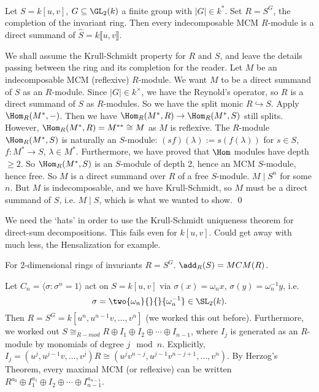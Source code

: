 \begin{thm}[Herzog, 1978]
Let $S= k[u,v]$, $G \subseteq \GL_2(k)$ a finite group with $|G| \in k^*$. Set $R= \widehat{S^G}$, the completion of the invariant ring. Then every indecomposable MCM $R$-module is a direct summand of $\hat{S}= k\llbracket u,v \rrbracket$.
\end{thm}

\pf We shall assume the Krull-Schmidt property for $R$ and $S$, and leave the details passing between the ring and its completion for the reader. Let $M$ be an indecomposable MCM (reflexive) $R$-module. We want $M$ to be a direct summand of $S$ as an $R$-module. Since $|G| \in k^\times$, we have the Reynold's operator, so $R$ is a direct summand of $S$ as $R$-modules. So we have the split monic $R \hookrightarrow S$. Apply $\Hom_R(M^*,-)$. Then we have $\Hom_R(M^*,R) \to \Hom_R(M^*,S)$ still splits. However, $\Hom_R(M^*,R)=M^{**} \cong M$ as $M$ is reflexive. The $R$-module $\Hom_R(M^*,S)$ is naturally an $S$-module: $(sf)(\lambda):= s(f(\lambda))$ for $s \in S$, $f: M^* \to S$, $\lambda \in M^*$. Furthermore, we have proved that $\Hom$ modules have depth $\geq 2$. So $\Hom_R(M^*,S)$ is an $S$-module of depth 2, hence an MCM $S$-module, hence free. So $M$ is a direct summand over $R$ of a free $S$-module. $M \mid S^n$ for some $n$. But $M$ is indecomposable, and we have Krull-Schmidt, so $M$ must be a direct summand of $S$, i.e. $M \mid S$, which is what we wanted to show. \qed \\


\begin{rem}
We need the `hats' in order to use the Krull-Schmidt uniqueness theorem for direct-sum decompositions. This fails even for $k[u,v]$. Could get away with much less, the Hensalization for example. 
\end{rem}


\begin{cor}
For 2-dimensional rings of invariants $R= S^G$. $\add_R(S)=MCM(R)$.
\end{cor}



\begin{ex}
Let $C_n= \langle \sigma \colon \sigma^n=1 \rangle$ act on $S= k[u,v]$ via $\sigma(x)= \omega_n x$, $\sigma(y)= \omega_n^{-1}y$, i.e. 
	\[
	\sigma = \two{\omega_n}{}{}{\omega_n^{-1}} \in \SL_2(k).
	\]
Then $R= S^G= k[u^n,u^{n-1}v, \ldots, v^n]$ (we worked this out before). Furthermore, we worked out $S \cong_{R-mod} R \oplus I_1 \oplus I_2 \oplus \cdots \oplus I_{n-1}$, where $I_j$ is generated as an $R$-module by monomials of degree $j \mod n$. Explicitly, $I_j= (u^j,u^{j-1}v,\ldots,v^j) R \cong (u^jv^{n-j}, u^{j-1}v^{n-j+1}, \ldots, v^n)$. By Herzog's Theorem, every maximal MCM (or reflexive) can be written $R^{a_0} \oplus I_1^{a_1} \oplus I_2 \oplus \cdots \oplus I_{n-1}^{a_{n-1}}$.
\end{ex}


